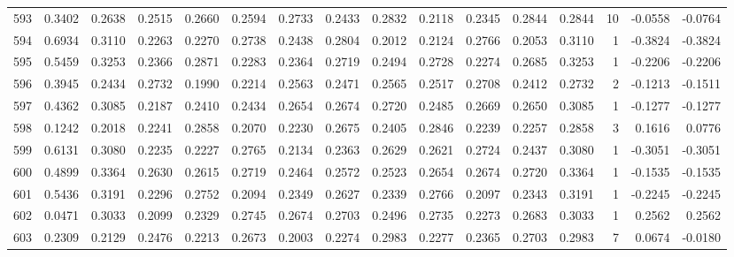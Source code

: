 \begin{tabular}{lrrrrrrrrrrrrrrr}
593 &      0.3402 &  0.2638 &  0.2515 &  0.2660 &  0.2594 &  0.2733 &  0.2433 &  0.2832 &  0.2118 &  0.2345 &   0.2844 &     0.2844 &     10 &                   -0.0558 &                    -0.0764 \\
594 &      0.6934 &  0.3110 &  0.2263 &  0.2270 &  0.2738 &  0.2438 &  0.2804 &  0.2012 &  0.2124 &  0.2766 &   0.2053 &     0.3110 &      1 &                   -0.3824 &                    -0.3824 \\
595 &      0.5459 &  0.3253 &  0.2366 &  0.2871 &  0.2283 &  0.2364 &  0.2719 &  0.2494 &  0.2728 &  0.2274 &   0.2685 &     0.3253 &      1 &                   -0.2206 &                    -0.2206 \\
596 &      0.3945 &  0.2434 &  0.2732 &  0.1990 &  0.2214 &  0.2563 &  0.2471 &  0.2565 &  0.2517 &  0.2708 &   0.2412 &     0.2732 &      2 &                   -0.1213 &                    -0.1511 \\
597 &      0.4362 &  0.3085 &  0.2187 &  0.2410 &  0.2434 &  0.2654 &  0.2674 &  0.2720 &  0.2485 &  0.2669 &   0.2650 &     0.3085 &      1 &                   -0.1277 &                    -0.1277 \\
598 &      0.1242 &  0.2018 &  0.2241 &  0.2858 &  0.2070 &  0.2230 &  0.2675 &  0.2405 &  0.2846 &  0.2239 &   0.2257 &     0.2858 &      3 &                    0.1616 &                     0.0776 \\
599 &      0.6131 &  0.3080 &  0.2235 &  0.2227 &  0.2765 &  0.2134 &  0.2363 &  0.2629 &  0.2621 &  0.2724 &   0.2437 &     0.3080 &      1 &                   -0.3051 &                    -0.3051 \\
600 &      0.4899 &  0.3364 &  0.2630 &  0.2615 &  0.2719 &  0.2464 &  0.2572 &  0.2523 &  0.2654 &  0.2674 &   0.2720 &     0.3364 &      1 &                   -0.1535 &                    -0.1535 \\
601 &      0.5436 &  0.3191 &  0.2296 &  0.2752 &  0.2094 &  0.2349 &  0.2627 &  0.2339 &  0.2766 &  0.2097 &   0.2343 &     0.3191 &      1 &                   -0.2245 &                    -0.2245 \\
602 &      0.0471 &  0.3033 &  0.2099 &  0.2329 &  0.2745 &  0.2674 &  0.2703 &  0.2496 &  0.2735 &  0.2273 &   0.2683 &     0.3033 &      1 &                    0.2562 &                     0.2562 \\
603 &      0.2309 &  0.2129 &  0.2476 &  0.2213 &  0.2673 &  0.2003 &  0.2274 &  0.2983 &  0.2277 &  0.2365 &   0.2703 &     0.2983 &      7 &                    0.0674 &                    -0.0180 \\

\end{tabular}

